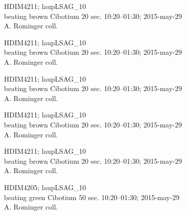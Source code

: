\documentclass[2pt]{extarticle}
\begin{document}
\noindent
\parbox{0.16\textwidth}{\tiny \raggedright \rule[-0.3\baselineskip]{0pt}{10pt}HDIM4211; laupLSAG\_10\\ beating brown Cibotium 20 sec. 10:20--01:30; 2015-may-29\\ A. Rominger coll.}
\parbox{0.16\textwidth}{\tiny \raggedright \rule[-0.3\baselineskip]{0pt}{10pt}HDIM4211; laupLSAG\_10\\ beating brown Cibotium 20 sec. 10:20--01:30; 2015-may-29\\ A. Rominger coll.}
\parbox{0.16\textwidth}{\tiny \raggedright \rule[-0.3\baselineskip]{0pt}{10pt}HDIM4211; laupLSAG\_10\\ beating brown Cibotium 20 sec. 10:20--01:30; 2015-may-29\\ A. Rominger coll.}
\parbox{0.16\textwidth}{\tiny \raggedright \rule[-0.3\baselineskip]{0pt}{10pt}HDIM4211; laupLSAG\_10\\ beating brown Cibotium 20 sec. 10:20--01:30; 2015-may-29\\ A. Rominger coll.}
\parbox{0.16\textwidth}{\tiny \raggedright \rule[-0.3\baselineskip]{0pt}{10pt}HDIM4211; laupLSAG\_10\\ beating brown Cibotium 20 sec. 10:20--01:30; 2015-may-29\\ A. Rominger coll.}
\parbox{0.16\textwidth}{\tiny \raggedright \rule[-0.3\baselineskip]{0pt}{10pt}HDIM4205; laupLSAG\_10\\ beating green Cibotium 50 sec. 10:20--01:30; 2015-may-29\\ A. Rominger coll.} \\ 
\vspace{0.001in} 
\end{document}
